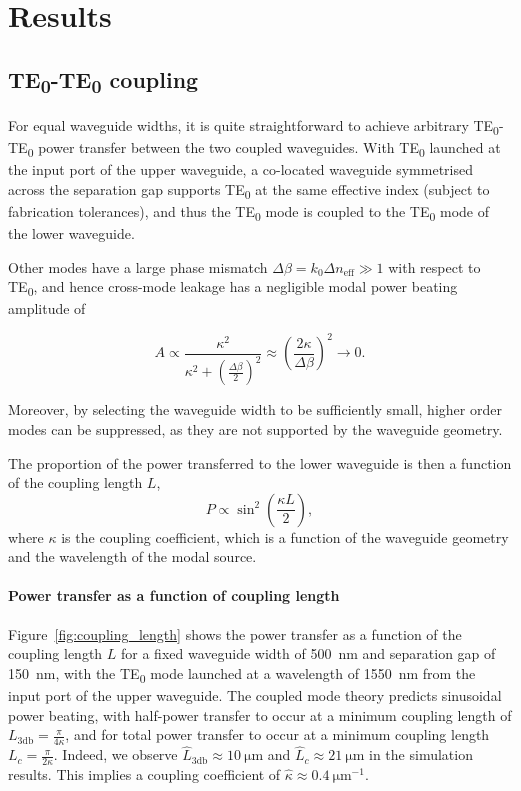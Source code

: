 \documentclass[10pt, a4paper]{article}
\begin{document}
\section{Results}

\subsection{TE\textsubscript{0}-TE\textsubscript{0} coupling}

For equal waveguide widths, it is quite straightforward to achieve arbitrary TE\textsubscript{0}-TE\textsubscript{0} power transfer between the two coupled waveguides.
With TE\textsubscript{0} launched at the input port of the upper waveguide, a co-located waveguide symmetrised across the separation gap supports TE\textsubscript{0} at the same effective index
(subject to fabrication tolerances),
and thus the TE\textsubscript{0} mode is coupled to the TE\textsubscript{0} mode of the lower waveguide.

Other modes have a large phase mismatch \(\Delta\beta=k_0\Delta n_\text{eff}\gg 1\) with respect to TE\textsubscript{0},
and hence cross-mode leakage has a negligible modal power beating amplitude of

\[A\propto\frac{\kappa^2}{\kappa^2+{(\frac{\Delta\beta}{2})}^2}\approx{\left(\frac{2\kappa}{\Delta\beta}\right)}^2\to 0.\]

Moreover, by selecting the waveguide width to be sufficiently small, higher order modes can be suppressed,
as they are not supported by the waveguide geometry.

The proportion of the power transferred to the lower waveguide is then a function of the coupling length \(L\),
\[
P\propto\sin^2\left(\frac{\kappa L}{2}\right),
\]
where \(\kappa\) is the coupling coefficient, which is a function of the waveguide geometry and the wavelength of the modal source.

\paragraph{Power transfer as a function of coupling length}
Figure~\ref{fig:coupling_length} shows the power transfer as a function of the coupling length \(L\) for a fixed waveguide width of \SI{500}{\nm} and separation gap of \SI{150}{\nm},
with the TE\textsubscript{0} mode launched at a wavelength of \SI{1550}{\nm} from the input port of the upper waveguide.
The coupled mode theory predicts sinusoidal power beating, with half-power transfer to occur at a minimum coupling length of \(L_{3\text{db}}=\frac{\pi}{4\kappa}\),
and for total power transfer to occur at a minimum coupling length \(L_c=\frac{\pi}{2\kappa}\).
Indeed, we observe \(\hat{L}_{3\text{db}}\approx\SI{10}{\um}\) and \(\hat{L}_c\approx\SI{21}{\um}\) in the simulation results. 
This implies a coupling coefficient of \(\hat{\kappa}\approx\SI{0.4}{\um^{-1}}\).
\end{document}

